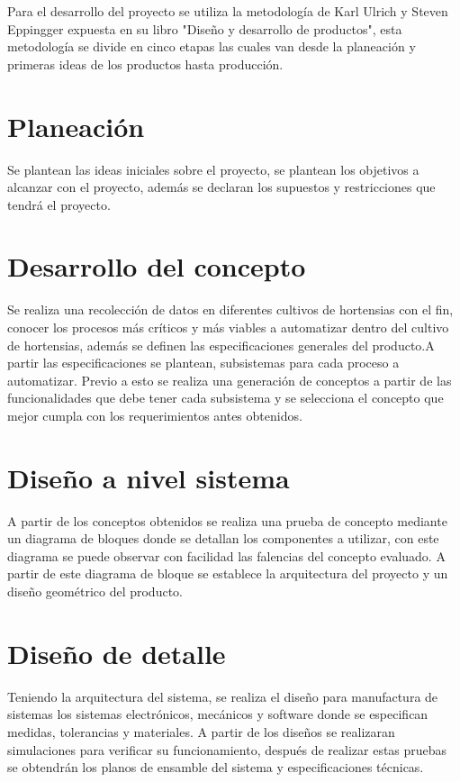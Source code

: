 


\minitoc

Para el desarrollo del proyecto se utiliza la metodología de Karl Ulrich y Steven Eppingger  expuesta en su libro "Diseño y desarrollo de productos", esta metodología se divide en cinco etapas las cuales van desde la planeación y primeras ideas de los productos hasta producción.
\section{Planeación}
Se plantean las ideas iniciales sobre el proyecto, se plantean los objetivos a alcanzar con el proyecto, además se declaran los supuestos y restricciones que tendrá el proyecto.
\section{Desarrollo del concepto}
Se realiza una recolección de datos en diferentes cultivos de hortensias con el fin, conocer los procesos más críticos y más viables a automatizar dentro del cultivo de hortensias,
además se definen las especificaciones generales del producto.A partir las especificaciones se plantean, subsistemas para cada proceso a automatizar. Previo a esto se realiza una generación de conceptos a partir de las funcionalidades que debe tener cada subsistema y se selecciona el concepto que mejor cumpla con los requerimientos antes obtenidos.
\section{Diseño a nivel sistema}
A partir de los conceptos obtenidos se realiza una prueba de concepto mediante un diagrama de bloques donde se detallan los componentes a utilizar, con este diagrama se puede observar con facilidad las falencias del concepto evaluado. A partir de este diagrama de bloque se establece la arquitectura del proyecto y un diseño geométrico del producto.
\section{Diseño de detalle}
Teniendo la arquitectura del sistema, se realiza el diseño para manufactura de sistemas los sistemas electrónicos, mecánicos y software donde se especifican medidas, tolerancias y materiales. A partir de los diseños se realizaran simulaciones para verificar su funcionamiento, después de realizar estas pruebas se obtendrán los planos de ensamble del sistema y especificaciones técnicas.

